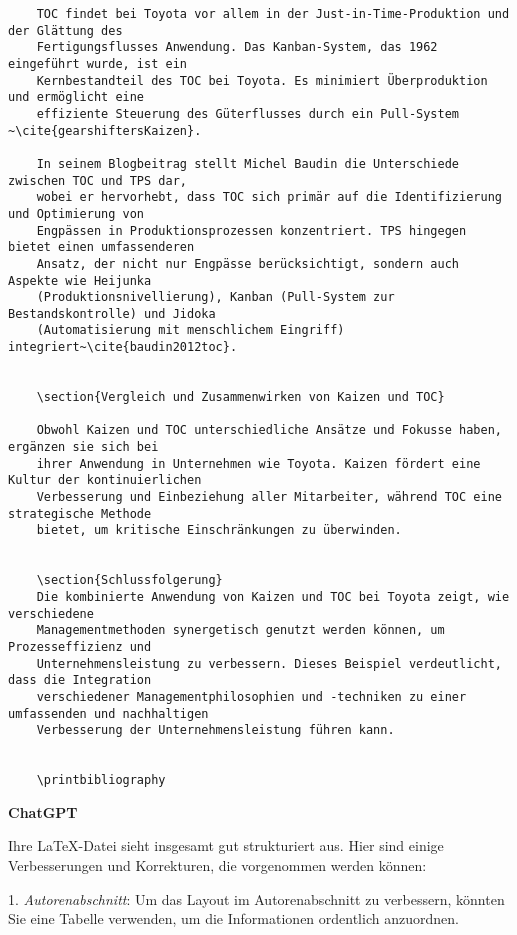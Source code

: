\begin{verbatim}
	TOC findet bei Toyota vor allem in der Just-in-Time-Produktion und der Glättung des
	Fertigungsflusses Anwendung. Das Kanban-System, das 1962 eingeführt wurde, ist ein
	Kernbestandteil des TOC bei Toyota. Es minimiert Überproduktion und ermöglicht eine
	effiziente Steuerung des Güterflusses durch ein Pull-System​~\cite{gearshiftersKaizen}.
	
	In seinem Blogbeitrag stellt Michel Baudin die Unterschiede zwischen TOC und TPS dar,
	wobei er hervorhebt, dass TOC sich primär auf die Identifizierung und Optimierung von 
	Engpässen in Produktionsprozessen konzentriert. TPS hingegen bietet einen umfassenderen
	Ansatz, der nicht nur Engpässe berücksichtigt, sondern auch Aspekte wie Heijunka 
	(Produktionsnivellierung), Kanban (Pull-System zur Bestandskontrolle) und Jidoka
	(Automatisierung mit menschlichem Eingriff) integriert~\cite{baudin2012toc}.
	
	
	\section{Vergleich und Zusammenwirken von Kaizen und TOC}
	
	Obwohl Kaizen und TOC unterschiedliche Ansätze und Fokusse haben, ergänzen sie sich bei
	ihrer Anwendung in Unternehmen wie Toyota. Kaizen fördert eine Kultur der kontinuierlichen
	Verbesserung und Einbeziehung aller Mitarbeiter, während TOC eine strategische Methode
	bietet, um kritische Einschränkungen zu überwinden.
	
	
	\section{Schlussfolgerung}
	Die kombinierte Anwendung von Kaizen und TOC bei Toyota zeigt, wie verschiedene 
	Managementmethoden synergetisch genutzt werden können, um Prozesseffizienz und 
	Unternehmensleistung zu verbessern. Dieses Beispiel verdeutlicht, dass die Integration 
	verschiedener Managementphilosophien und -techniken zu einer umfassenden und nachhaltigen 
	Verbesserung der Unternehmensleistung führen kann.
	
	
	\printbibliography

\end{verbatim}

\textbf{ChatGPT}

Ihre \LaTeX{}-Datei sieht insgesamt gut strukturiert aus. Hier sind einige Verbesserungen und Korrekturen, die vorgenommen werden können:

1. \textit{Autorenabschnitt}: Um das Layout im Autorenabschnitt zu verbessern, könnten Sie eine Tabelle verwenden, um die Informationen ordentlich anzuordnen.


